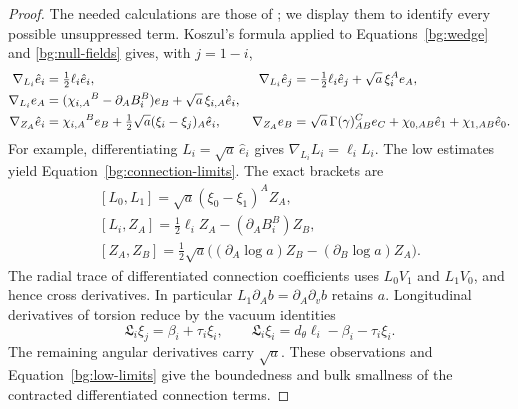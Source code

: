 \begin{proof}
The needed calculations are those of
\cite[]{Foundation}; we display
them to identify every possible unsuppressed term.  Koszul's formula
applied to Equations~\eqref{bg:wedge} and \eqref{bg:null-fields}
gives, with $j=1-i$,
\begin{align}
 \nabla_{L_i}\hat e_i&=\tfrac12\ell_i\hat e_i,&
 \nabla_{L_i}\hat e_j&=-\tfrac12\ell_i\hat e_j
                         +\sqrt a\,\xi_i^Ae_A,\label{bg:radial-connection}\\
 \nabla_{L_i}e_A&=(\chi_{i,A}{}^B-\partial_AB_i^B)e_B
                         +\sqrt a\,\xi_{i,A}\hat e_i,\notag\\
 \nabla_{Z_A}\hat e_i&=\chi_{i,A}{}^Be_B
          +\tfrac12\sqrt a(\xi_i-\xi_j)_A\hat e_i,&
 \nabla_{Z_A}e_B&=\sqrt a\,\Gamma(\gamma)_{AB}^Ce_C
             +\chi_{0,AB}\hat e_1+\chi_{1,AB}\hat e_0.\notag
\end{align}
For example, differentiating $L_i=\sqrt a\,\hat e_i$ gives
$\nabla_{L_i}L_i=\ell_iL_i$.  The low estimates yield
Equation~\eqref{bg:connection-limits}.  The exact brackets are
\begin{equation}\label{bg:brackets}
\begin{gathered}
 [L_0,L_1]=\sqrt a(\xi_0-\xi_1)^AZ_A,\\
 [L_i,Z_A]=\tfrac12\ell_iZ_A-(\partial_AB_i^B)Z_B,\\
 [Z_A,Z_B]=\tfrac12\sqrt a\bigl(
       (\partial_A\log a)Z_B-(\partial_B\log a)Z_A\bigr).
\end{gathered}
\end{equation}
The radial trace of differentiated connection coefficients uses
$L_0V_1$ and $L_1V_0$, and hence cross derivatives.  In particular
$L_1\partial_Ab=\partial_A\partial_vb$ retains $a$.
Longitudinal derivatives of torsion reduce by the vacuum identities
\[
 \mathfrak L_i\xi_j=\beta_i+\tau_i\xi_i,
 \qquad \mathfrak L_i\xi_i=d_\theta\ell_i-\beta_i-\tau_i\xi_i.
\]
The remaining angular derivatives carry $\sqrt a$.
These observations and Equation~\eqref{bg:low-limits} give the
boundedness and bulk smallness of the contracted differentiated
connection terms.


\end{proof}
